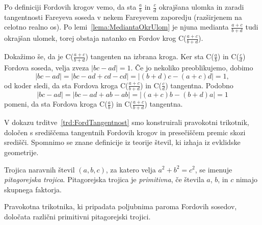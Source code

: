 \documentclass[mat1]{fmfdelo}
\begin{document}
\begin{dokaz}
Po definiciji Fordovih krogov vemo, da sta $\frac{a}{b}$ in $\frac{c}{d}$ okrajšana ulomka in zaradi tangentnosti Fareyeva soseda v nekem Fareyevem zaporedju (razširjenem na celotno realno os). Po lemi~\ref{lema:MediantaOkrUlom} je njuna medianta $\frac{a+c}{b+d}$ tudi okrajšan ulomek, torej obstaja natanko en Fordov krog C($\frac{a+c}{b+d}$). 

Dokažimo še, da je C($\frac{a+c}{b+d}$) tangenten na izbrana kroga. Ker sta C($\frac{a}{b}$) in C($\frac{c}{d}$) Fordova soseda, velja zveza 
\( |bc-ad|=1. \)
Če jo nekoliko preoblikujemo, dobimo
\[ |bc-ad|=|bc-ad+cd-cd|=|(b+d)c-(a+c)d|=1, \]
od koder sledi, da sta Fordova kroga C($\frac{a+c}{b+d}$) in C($\frac{c}{d}$) tangentna.
Podobno
\[ |bc-ad|=|bc-ad+ab-ab|=|(a+c)b-(b+d)a|=1 \]
pomeni, da sta Fordova kroga C($\frac{a}{b}$) in C($\frac{a+c}{b+d}$) tangentna.
\end{dokaz}

%
V dokazu trditve~\ref{trd:FordTangentnost} smo konstruirali pravokotni trikotnik, določen s središčema tangentnih Fordovih krogov in presečiščem premic skozi središči. Spomnimo se znane definicije iz teorije števil, ki izhaja iz evklidske geometrije. 

\begin{definicija}
Trojica naravnih števil $(a,b,c)$, za katero velja $a^2+b^2=c^2$, se imenuje \emph{pitagorejska trojica}.
Pitagorejska trojica je \emph{primitivna}, če števila $a$, $b$, in $c$ nimajo skupnega faktorja.
\end{definicija}

\begin{trditev}
Pravokotna trikotnika, ki pripadata poljubnima paroma Fordovih sosedov, določata različni primitivni pitagorejski trojici.
\end{trditev}
\end{document}
